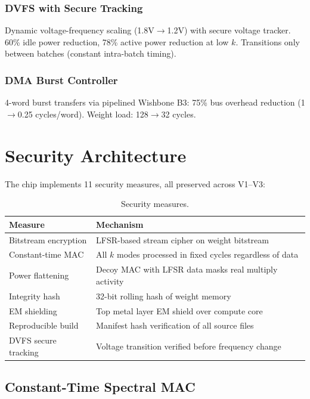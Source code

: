 \documentclass[11pt,a4paper]{article}
\theoremstyle{definition}
\theoremstyle{remark}
\begin{document}
\subsubsection{DVFS with Secure Tracking}
Dynamic voltage-frequency scaling (1.8V$\to$1.2V) with secure voltage tracker.
60\% idle power reduction, 78\% active power reduction at low $k$. Transitions
only between batches (constant intra-batch timing).

\subsubsection{DMA Burst Controller}
4-word burst transfers via pipelined Wishbone B3: 75\% bus overhead reduction
(1$\to$0.25 cycles/word). Weight load: 128$\to$32 cycles.

\section{Security Architecture}

The chip implements 11 security measures, all preserved across V1--V3:

\begin{table}[h]
\centering
\caption{Security measures.}
\label{tab:security}
\begin{tabular}{ll}
\toprule
\textbf{Measure} & \textbf{Mechanism} \\
\midrule
Bitstream encryption & LFSR-based stream cipher on weight bitstream \\
Constant-time MAC & All $k$ modes processed in fixed cycles regardless of data \\
Power flattening & Decoy MAC with LFSR data masks real multiply activity \\
Integrity hash & 32-bit rolling hash of weight memory \\
EM shielding & Top metal layer EM shield over compute core \\
Reproducible build & Manifest hash verification of all source files \\
DVFS secure tracking & Voltage transition verified before frequency change \\
\bottomrule
\end{tabular}
\end{table}

\subsection{Constant-Time Spectral MAC}
\end{document}
